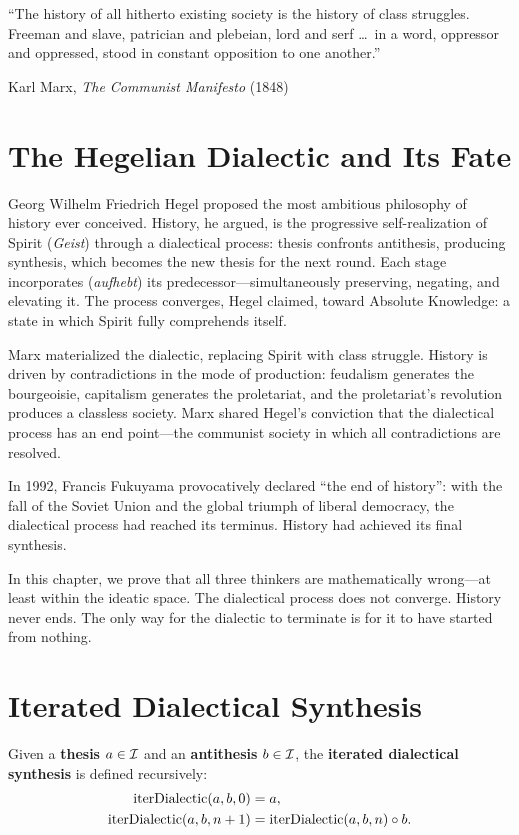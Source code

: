 \epigraph{``The history of all hitherto existing society is the history of
class struggles.  Freeman and slave, patrician and plebeian, lord and serf
\ldots\ in a word, oppressor and oppressed, stood in constant opposition
to one another.''}{Karl Marx, \textit{The Communist Manifesto} (1848)}

\section{The Hegelian Dialectic and Its Fate}

Georg Wilhelm Friedrich Hegel proposed the most ambitious philosophy of
history ever conceived.  History, he argued, is the progressive
self-realization of Spirit (\textit{Geist}) through a dialectical process:
thesis confronts antithesis, producing synthesis, which becomes the new
thesis for the next round.  Each stage incorporates (\textit{aufhebt})
its predecessor---simultaneously preserving, negating, and elevating it.
The process converges, Hegel claimed, toward Absolute Knowledge: a state
in which Spirit fully comprehends itself.

Marx materialized the dialectic, replacing Spirit with class struggle.
History is driven by contradictions in the mode of production: feudalism
generates the bourgeoisie, capitalism generates the proletariat, and the
proletariat's revolution produces a classless society.  Marx shared
Hegel's conviction that the dialectical process has an end point---the
communist society in which all contradictions are resolved.

In 1992, Francis Fukuyama provocatively declared ``the end of history'':
with the fall of the Soviet Union and the global triumph of liberal
democracy, the dialectical process had reached its terminus.  History
had achieved its final synthesis.

In this chapter, we prove that all three thinkers are mathematically
wrong---at least within the ideatic space.  The dialectical process
does not converge.  History never ends.  The only way for the dialectic
to terminate is for it to have started from nothing.

\section{Iterated Dialectical Synthesis}

\begin{definition}
\label{def:iter-dialectic}
Given a \textbf{thesis} $a \in \mathcal{I}$ and an \textbf{antithesis} $b \in \mathcal{I}$,
the \textbf{iterated dialectical synthesis} is defined recursively:
\begin{align}
\mathrm{iterDialectic}(a, b, 0) &= a, \\
\mathrm{iterDialectic}(a, b, n+1) &=
\mathrm{iterDialectic}(a, b, n) \circ b.
\end{align}
\end{definition}

